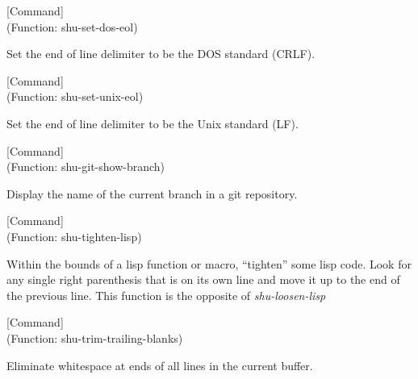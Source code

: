 \vspace{1em}
\noindent
{}
\usebox{\funcname}
 \hfill [Command]\\%
 (Function: shu-set-dos-eol)

\begin{doc-string}
Set the end of line delimiter to be the DOS standard (CRLF).
\end{doc-string}

\vspace{1em}
\noindent
{}
\usebox{\funcname}
 \hfill [Command]\\%
 (Function: shu-set-unix-eol)

\begin{doc-string}
Set the end of line delimiter to be the Unix standard (LF).
\end{doc-string}

\vspace{1em}
\noindent
{}
\usebox{\funcname}
 \hfill [Command]\\%
 (Function: shu-git-show-branch)

\begin{doc-string}
Display the name of the current branch in a git repository.
\end{doc-string}

\vspace{1em}
\noindent
{}
\usebox{\funcname}
 \hfill [Command]\\%
 (Function: shu-tighten-lisp)

\begin{doc-string}
Within the bounds of a lisp function or macro, ``tighten'' some lisp code.
Look for any single right parenthesis that is on its own line and move it up to
the end of the previous line.  This function is the opposite of \emph{shu-loosen-lisp}
\end{doc-string}

\vspace{1em}
\noindent
{}
\usebox{\funcname}
 \hfill [Command]\\%
 (Function: shu-trim-trailing-blanks)

\begin{doc-string}
Eliminate whitespace at ends of all lines in the current buffer.
\end{doc-string}

